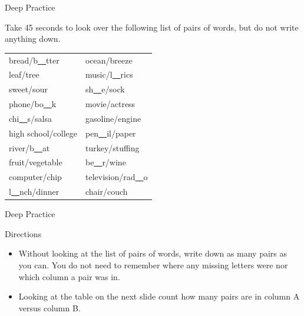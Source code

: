 \documentclass[10pt]{beamer}
\begin{document}
\begin{frame}{Deep Practice}

\vspace{2em}

Take 45 seconds to look over the following list of pairs of words, but do not write anything down.

\begin{table}[h]
\centering
\begin{tabular}{@{}ll@{}}
\toprule
bread/b\underline{\ \ }tter & ocean/breeze \\
leaf/tree & music/l\underline{\ \ }rics\\
sweet/sour & sh\underline{\ \ }e/sock\\
phone/bo\underline{\ \ }k & movie/actress \\
chi\underline{\ \ }s/salsa & gasoline/engine \\
high school/college & pen\underline{\ \ }il/paper\\
river/b\underline{\ \ }at & turkey/stuffing \\
fruit/vegetable & be\underline{\ \ }r/wine\\
computer/chip & television/rad\underline{\ \ }o\\
l\underline{\ \ }nch/dinner & chair/couch \\
\bottomrule
\end{tabular}
\end{table}

\end{frame}


\begin{frame}{Deep Practice}

\vspace{2em}

\begin{block}{Directions}
\vspace{-.75em}
\begin{itemize}
\item Without looking at the list of pairs of words, write down as many pairs as you can.  You do not need to remember where any missing letters were nor which column a pair was in.
\item Looking at the table on the next slide count how many pairs are in column A versus column B.
\end{itemize}
\end{block}

\end{frame}
\end{document}
